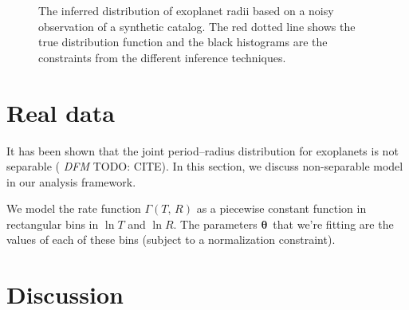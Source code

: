 \documentclass[12pt,preprint]{aastex}
\newcommand{\figlabel}[1]{\label{fig:#1}}
\newcommand{\bvec}[1]{\ensuremath{\boldsymbol{#1}}}
\newcommand{\todo}[3]{{\color{#2} \emph{#1} TODO: #3}}
\newcommand{\dfmtodo}[1]{\todo{DFM}{red}{#1}}
\newcommand{\rate}{\ensuremath{\Gamma}}
\newcommand{\ratepar}{{\ensuremath{\theta}}}
\newcommand{\ratepars}{{\ensuremath{\bvec{\ratepar}}}}
\newcommand{\radius}{\ensuremath{R}}
\newcommand{\period}{\ensuremath{T}}
\begin{document}
\begin{figure}[htbp]
\begin{center}
\end{center}
\caption{%
The inferred distribution of exoplanet radii based on a noisy observation of a
synthetic catalog.
The red dotted line shows the true distribution function and the black
histograms are the constraints from the different inference techniques.
\figlabel{synthetic-radius}}
\end{figure}

\section{Real data}

It has been shown that the joint period--radius distribution for exoplanets is
not separable (\dfmtodo{CITE}).
In this section, we discuss non-separable model in our analysis framework.

We model the rate function $\rate(\period,\,\radius)$ as a piecewise constant
function in rectangular bins in $\ln\period$ and $\ln\radius$.
The parameters \ratepars\ that we're fitting are the values of each of these
bins (subject to a normalization constraint).

\section{Discussion}
\end{document}
